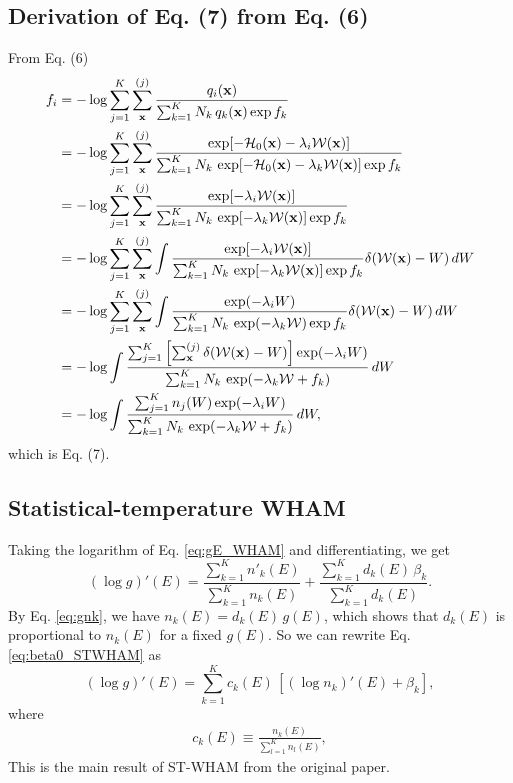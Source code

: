 \documentclass[aip,jcp,preprint,notitlepage, superscriptaddress]{revtex4-1}
\begin{document}
\subsection{Derivation of Eq. (7) from Eq. (6)}



From Eq. (6)
\begin{align*}
f_i
&=
-\log
\sum_{j = 1}^K
\sum_{\mathbf{x}}^{(j)}
\frac{
  q_i(\mathbf{x})
}
{
  \sum_{k = 1}^K N_k \, q_k(\mathbf{x}) \exp f_k
}
\\
&=
-\log
\sum_{j = 1}^K
\sum_{\mathbf{x}}^{(j)}
\frac{
  \exp[-\mathcal{H}_0(\mathbf{x}) - \lambda_i \mathcal{W}(\mathbf{x})]
}
{
  \sum_{k = 1}^K N_k \,
  \exp[-\mathcal{H}_0(\mathbf{x}) - \lambda_k \mathcal{W}(\mathbf{x})]
  \exp f_k
}
\\
&=
-\log
\sum_{j = 1}^K
\sum_{\mathbf{x}}^{(j)}
\frac{
  \exp[- \lambda_i \mathcal{W}(\mathbf{x})]
}
{
  \sum_{k = 1}^K N_k \,
  \exp[ - \lambda_k \mathcal{W}(\mathbf{x})]
  \exp f_k
}
\\
&=
-\log
\sum_{j = 1}^K
\sum_{\mathbf{x}}^{(j)}
\int
\frac{
  \exp[- \lambda_i \mathcal{W}(\mathbf{x})]
}
{
  \sum_{k = 1}^K N_k \,
  \exp[ - \lambda_k \mathcal{W}(\mathbf{x})]
  \exp f_k
}
\delta(\mathcal{W}(\mathbf{x}) - W) \, dW
\\
&=
-\log
\sum_{j = 1}^K
\sum_{\mathbf{x}}^{(j)}
\int
\frac{
  \exp(- \lambda_i W)
}
{
  \sum_{k = 1}^K N_k \,
  \exp( - \lambda_k \mathcal{W})
  \exp f_k
}
\delta(\mathcal{W}(\mathbf{x}) - W)
\, dW
\\
&=
-\log
\int
\frac{
  \sum_{j = 1}^K
  \left[
    \sum_{\mathbf{x}}^{(j)}
    \delta(\mathcal{W}(\mathbf{x}) - W)
  \right]
  \exp(- \lambda_i W)
}
{
  \sum_{k = 1}^K N_k \,
  \exp( - \lambda_k \mathcal{W} + f_k )
}
\, dW
\\
&=
-\log
\int
\frac{
  \sum_{j = 1}^K
  n_j(W)
  \exp(- \lambda_i W)
}
{
  \sum_{k = 1}^K N_k \,
  \exp( - \lambda_k \mathcal{W} + f_k )
}
\, dW,
\end{align*}
which is Eq. (7).




\subsection{Statistical-temperature WHAM}



Taking the logarithm of Eq. \eqref{eq:gE_WHAM} and differentiating,
we get
\begin{equation}
(\log g)'(E)
=
\frac{ \sum_{k = 1}^K n'_k(E) }
     { \sum_{k = 1}^K n_k(E) }
+
\frac{ \sum_{k = 1}^K d_k(E) \, \beta_k }
     { \sum_{k = 1}^K d_k(E) }.
\label{eq:beta0_STWHAM}
\end{equation}
%
By Eq. \eqref{eq:gnk},
we have
$n_k(E) = d_k(E) \, g(E)$,
which shows that
$d_k(E)$
is proportional to $n_k(E)$
for a fixed $g(E)$.
%
So we can rewrite Eq. \eqref{eq:beta0_STWHAM} as
%
\begin{equation}
(\log g)'(E)
=
\sum_{k = 1}^K c_k(E) \, \left[ (\log n_k)'(E)  + \beta_k \right],
\label{eq:beta_STWHAM}
\end{equation}
%
where
\begin{align}
  c_k(E) \equiv \frac{ n_k(E)  }{ \sum_{l = 1}^{K} n_l(E) },
  \label{eq:ck}
\end{align}
%
This is the main result of ST-WHAM
from the original paper\cite{
kim2011}.
\end{document}
